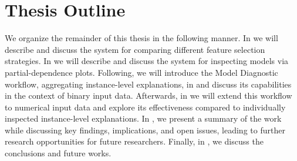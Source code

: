 \section{Thesis Outline}
We organize the remainder of this thesis in the following manner.
In  we will describe and discuss the \infuse system for comparing different feature selection strategies.
In  we will describe and discuss the \prospector system for inspecting models via partial-dependence plots.
Following, we will introduce the Model Diagnostic workflow, aggregating instance-level explanations, in  and discuss its capabilities in the context of binary input data.
Afterwards, in  we will extend this workflow to numerical input data and explore its effectiveness compared to individually inspected instance-level explanations.
In , we present a summary of the work while discussing key findings, implications, and open issues, leading to further research opportunities for future researchers.
Finally, in , we discuss the conclusions and future works.
